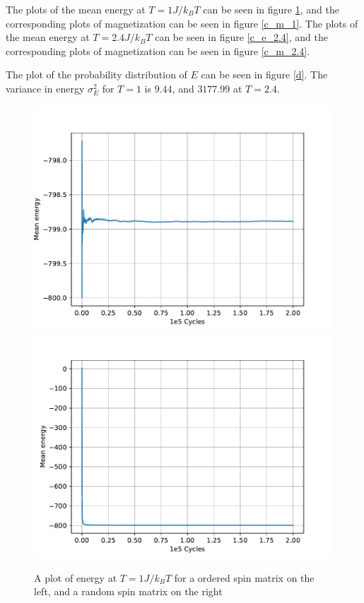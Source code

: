 \documentclass[a4paper]{article}
\begin{document}
The plots of the mean energy at $T = 1J/k_B T$ can be seen in figure \ref{c_e_1}, and the corresponding plots of magnetization can be seen in figure \ref{c_m_1}. The plots of the mean energy at $T = 2.4J/k_B T$ can be seen in figure \ref{c_e_2.4}, and the corresponding plots of magnetization can be seen in figure \ref{c_m_2.4}. 

The plot of the probability distribution of $E$ can be seen in figure \ref{d}. The variance in energy $\sigma_{E}^{2}$ for $T=1$ is $9.44$, and $3177.99$ at $T=2.4$.

\begin{figure}[!htb]
	\centering 
	\includegraphics[scale=0.56]{../opp_c_e_10K_200000_o.pdf}
	\includegraphics[scale=0.56]{../opp_c_e_10K_200000_r.pdf}
	\caption{A plot of energy at $T = 1J/k_B T$ for a ordered spin matrix on the left, and a random spin matrix on the right}
	\label{c_e_1}
\end{figure}
\end{document}
